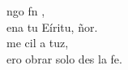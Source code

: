 \begin{cancion}%
	ngo fn ,\\
	ena tu Eíritu, ñor.\\
	me cil a tuz,\\
	ero obrar  solo des la fe.\\
\end{cancion}%
